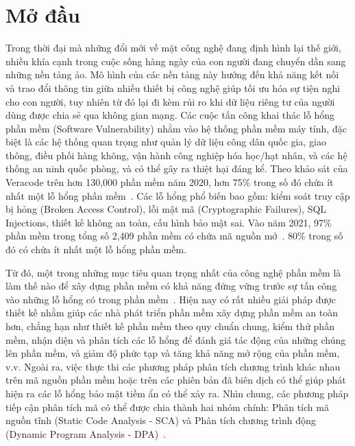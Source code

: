\chapter*{Mở đầu}
\setcounter{page}{1}
Trong thời đại mà những đổi mới về mặt công nghệ đang định hình lại thế giới, nhiều khía cạnh trong cuộc sống hàng ngày của con người đang chuyển dần sang những nền tảng ảo. Mô hình của các nền tảng này hướng đến khả năng kết nối và trao đổi thông tin giữa nhiều thiết bị công nghệ giúp tối ưu hóa sự tiện nghi cho con người, tuy nhiên từ đó lại đi kèm rủi ro khi dữ liệu riêng tư của người dùng được chia sẻ qua không gian mạng. Các cuộc tấn công khai thác lỗ hổng phần mềm (Software Vulnerability) nhằm vào hệ thống phần mềm máy tính, đặc biệt là các hệ thống quan trọng như quản lý dữ liệu công dân quốc gia, giao thông, điều phối hàng không, vận hành công nghiệp hóa học/hạt nhân, và các hệ thống an ninh quốc phòng, và có thể gây ra thiệt hại đáng kể. Theo khảo sát của Veracode trên hơn 130,000 phần mềm năm 2020, hơn 75\% trong số đó chứa ít nhất một lỗ hổng phần mềm~\cite{veracode}. Các lỗ hổng phổ biến bao gồm: kiểm soát truy cập bị hỏng (Broken Access Control), lỗi mật mã (Cryptographic Failures), SQL Injections, thiết kế không an toàn, cấu hình bảo mật sai. Vào năm 2021, 97\% phần mềm trong tổng số 2,409 phần mềm có chứa mã nguồn mở~\cite{synopsys}. 80\% trong số đó có chứa ít nhất một lỗ hổng phần mềm.


Từ đó, một trong những mục tiêu quan trọng nhất của công nghệ phần mềm là làm thế nào để xây dựng phần mềm có khả năng đứng vững trước sự tấn công vào những lỗ hổng có trong phần mềm~\cite{mcgraw2006software}. Hiện nay có rất nhiều giải pháp được thiết kế nhằm giúp các nhà phát triển phần mềm xây dựng phần mềm an toàn hơn, chẳng hạn như thiết kế phần mềm theo quy chuẩn chung, kiểm thử phần mềm, nhận diện và phân tích các lỗ hổng để đánh giá tác động của những chúng lên phần mềm, và giảm độ phức tạp và tăng khả năng mở rộng của phần mềm, v.v. Ngoài ra, việc thực thi các phương pháp phân tích chương trình khác nhau trên mã nguồn phần mềm hoặc trên các phiên bản đã biên dịch có thể giúp phát hiện ra các lỗ hổng bảo mật tiềm ẩn có thể xảy ra. Nhìn chung, các phương pháp tiếp cận phân tích mã có thể được chia thành hai nhóm chính: Phân tích mã nguồn tĩnh (Static Code Analysis - SCA) và Phân tích chương trình động (Dynamic Program Analysis - DPA)~\cite{mcgraw2006software}.

